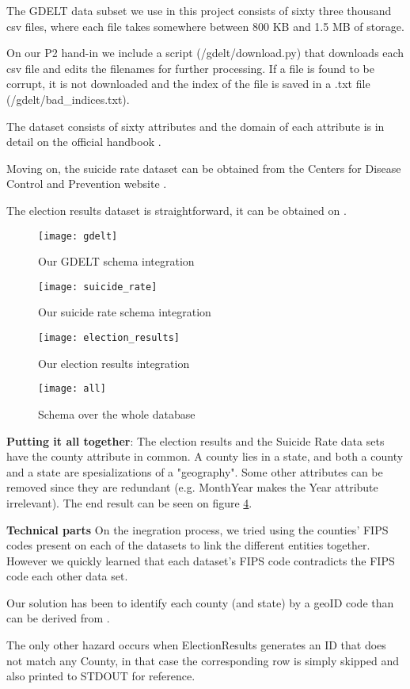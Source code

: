 The GDELT data subset we use in this project consists of sixty
three thousand csv files, where each file takes somewhere between
800 KB and 1.5 MB of storage.

On our P2 hand-in we include a script
(/gdelt/download.py) that downloads each csv file
and edits the filenames for further processing.
If a file is found to be corrupt, it is not downloaded and
the index of the file is saved in a .txt file
(/gdelt/bad\_indices.txt).

The dataset consists of sixty attributes and the domain of
each attribute is in detail on the official handbook
{\color{red}{citation}}.

Moving on, the suicide rate dataset can be obtained from
the Centers for Disease Control and Prevention
website \cite{suicide_website}.

The election results dataset is straightforward, it can be
obtained on {\color{red}{todo}}.

\begin{figure}
	\centering
	\texttt{[image: gdelt]}
	\caption{Our GDELT schema integration}
	\label{fig:gdelt}
\end{figure}

\begin{figure}
	\centering
	\texttt{[image: suicide\_rate]}
	\caption{Our suicide rate schema integration}
	\label{fig:suicide_rate}
\end{figure}

\begin{figure}
	\centering
	\texttt{[image: election\_results]}
	\caption{Our election results integration}
	\label{fig:election_results}
\end{figure}

\begin{figure}
	\centering
	\texttt{[image: all]}
	\caption{Schema over the whole database}
	\label{fig:all}
\end{figure}


\textbf{Putting it all together}:
The election results and the Suicide Rate data sets have the
county attribute in common.
A county lies in a state, and both a county and a state are
spesializations of a "geography".
Some other attributes can be removed since they are redundant
(e.g. MonthYear makes the Year attribute irrelevant).
The end result can be seen on figure \ref{fig:all}.

\textbf{Technical parts}
On the inegration process, we tried using the counties' FIPS codes
present on each of the datasets to link the different entities
together.
However we quickly learned that each dataset's FIPS code
contradicts the FIPS code each other data set.

Our solution has been to identify each county (and state)
by a geoID code than can be derived from {\color{red}{todo
https://community.esri.com/thread/24614
ESRI
}}.

The only other hazard occurs when ElectionResults generates an
ID that does not match any County, in that case the corresponding
row is simply skipped and also printed to STDOUT for reference.
